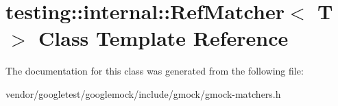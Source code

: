 \hypertarget{classtesting_1_1internal_1_1_ref_matcher}{}\section{testing\+:\+:internal\+:\+:Ref\+Matcher$<$ T $>$ Class Template Reference}
\label{classtesting_1_1internal_1_1_ref_matcher}


The documentation for this class was generated from the following file\+:\begin{DoxyCompactItemize}
\item 
vendor/googletest/googlemock/include/gmock/gmock-\/matchers.\+h\end{DoxyCompactItemize}

